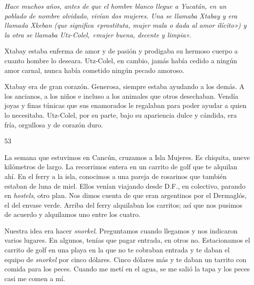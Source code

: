 \documentclass[12pt,twoside,openright,a5paper]{book}
\begin{document}
\nopagebreak

\vspace{0.5cm}

\nopagebreak

{\em Hace muchos años, antes de que el hombre blanco llegue a Yucatán,
en un poblado de nombre olvidado, vivían dos mujeres. Una se llamaba Xtabay
y era llamada Xkeban (que significa «prostituta, mujer mala o dada al amor
ilícito») y la otra se llamaba Utz-Colel, «mujer buena, decente y limpia».

Xtabay estaba enferma de amor y de pasión y prodigaba su hermoso cuerpo
a cuanto hombre lo deseara. Utz-Colel, en cambio, jamás había cedido a
ningún amor carnal, nunca había cometido ningún pecado amoroso.

Xtabay era de gran corazón. Generosa, siempre estaba ayudando a los
demás. A los ancianos, a los niños e incluso a los animales que otros
desechaban. Vendía joyas y finas túnicas que sus enamorados le regalaban
para poder ayudar a quien lo necesitaba. Utz-Colel, por su parte, bajo su
apariencia dulce y cándida, era fría, orgullosa y de corazón duro.}

\vspace{0.5cm}
\afterpage{}
\hrulefill \hspace{0.1cm}\decofourleft\hspace{0.2cm} 53 \hspace{0.2cm}\decofourright \hspace{0.1cm}\hrulefill

\nopagebreak

\vspace{0.5cm}

\nopagebreak

La semana que estuvimos en Cancún, cruzamos a Isla Mujeres. Es chiquita,
nueve kilómetros de
largo. La recorrimos entera en un carrito de golf que te alquilan ahí. En
el ferry a la isla, conocimos a una pareja de rosarinos que también estaban
de luna de miel. Ellos venían viajando desde D.F., en colectivo, parando
en \emph{hostels}, otro plan. Nos dimos cuenta de que eran argentinos por el Dermaglós,
el del envase verde. Arriba del ferry alquilaban los carritos; así que nos
pusimos de acuerdo y alquilamos uno entre los cuatro.

Nuestra idea era hacer \emph{snorkel}. Preguntamos cuando llegamos y nos
indicaron varios lugares. En algunos, tenías que pagar entrada, en otros
no. Estacionamos el carrito de golf en una playa en la que no te cobraban
entrada y te daban el equipo de \emph{snorkel} por cinco dólares. Cinco dólares más y
te daban un tarrito con comida para los peces. Cuando me metí en el agua,
se me salió la tapa y los peces casi me comen a mí.
\end{document}
